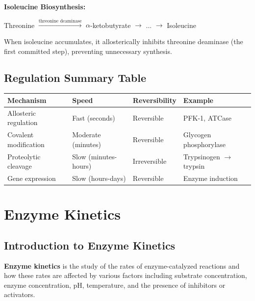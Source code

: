\begin{example}
\textbf{Isoleucine Biosynthesis:}

\begin{center}
Threonine $\xrightarrow{\text{threonine deaminase}}$ $\alpha$-ketobutyrate $\rightarrow$ ... $\rightarrow$ Isoleucine
\end{center}

When isoleucine accumulates, it allosterically inhibits threonine deaminase (the first committed step), preventing unnecessary synthesis.
\end{example}

\subsection{Regulation Summary Table}

\begin{center}
\begin{tabular}{|l|l|l|l|}
\hline
\textbf{Mechanism} & \textbf{Speed} & \textbf{Reversibility} & \textbf{Example} \\
\hline
Allosteric regulation & Fast (seconds) & Reversible & PFK-1, ATCase \\
\hline
Covalent modification & Moderate (minutes) & Reversible & Glycogen phosphorylase \\
\hline
Proteolytic cleavage & Slow (minutes-hours) & Irreversible & Trypsinogen $\rightarrow$ trypsin \\
\hline
Gene expression & Slow (hours-days) & Reversible & Enzyme induction \\
\hline
\end{tabular}
\end{center}


\section{Enzyme Kinetics}

\subsection{Introduction to Enzyme Kinetics}

\begin{definition}
\textbf{Enzyme kinetics} is the study of the rates of enzyme-catalyzed reactions and how these rates are affected by various factors including substrate concentration, enzyme concentration, pH, temperature, and the presence of inhibitors or activators.
\end{definition}

